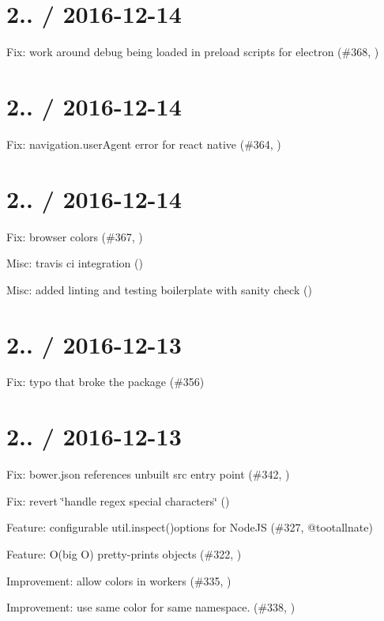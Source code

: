 \section*{2.. / 2016-\/12-\/14 }


\begin{DoxyItemize}
\item Fix\+: work around debug being loaded in preload scripts for electron (\#368, )
\end{DoxyItemize}

\section*{2.. / 2016-\/12-\/14 }


\begin{DoxyItemize}
\item Fix\+: navigation.\+user\+Agent error for react native (\#364, )
\end{DoxyItemize}

\section*{2.. / 2016-\/12-\/14 }


\begin{DoxyItemize}
\item Fix\+: browser colors (\#367, )
\item Misc\+: travis ci integration ()
\item Misc\+: added linting and testing boilerplate with sanity check ()
\end{DoxyItemize}

\section*{2.. / 2016-\/12-\/13 }


\begin{DoxyItemize}
\item Fix\+: typo that broke the package (\#356)
\end{DoxyItemize}

\section*{2.. / 2016-\/12-\/13 }


\begin{DoxyItemize}
\item Fix\+: bower.\+json references unbuilt src entry point (\#342, )
\item Fix\+: revert \char`\"{}handle regex special characters\char`\"{} ()
\item Feature\+: configurable util.\+inspect(){\ttfamily options for Node\+JS (\#327, @tootallnate)}
\item {\ttfamily Feature\+: O}(big O) pretty-\/prints objects (\#322, )
\item Improvement\+: allow colors in workers (\#335, )
\item Improvement\+: use same color for same namespace. (\#338, )
\end{DoxyItemize}

